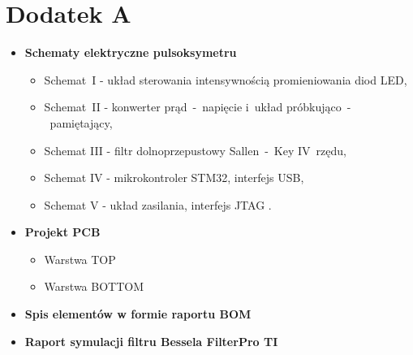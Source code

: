 \renewcommand{\figurename}{Rys.}

\chapter*{Dodatek A}
\label{cha:dodatekA}


\fontsize{14}{15}\selectfont
\begin{itemize}
	\item \textbf{Schematy elektryczne pulsoksymetru}
		\begin{itemize}
			\item Schemat~I  - układ sterowania intensywnością promieniowania diod LED,
			\item Schemat~II - konwerter prąd~-~napięcie i~układ  próbkująco~-~pamiętający,
			\item Schemat III - filtr dolnoprzepustowy Sallen~-~Key IV~rzędu,
			\item Schemat IV - mikrokontroler STM32, interfejs USB,
			\item Schemat V  - układ zasilania, interfejs JTAG .
		\end{itemize}
	\item \textbf{Projekt PCB}
		\begin{itemize}
			\item Warstwa TOP
			\item Warstwa BOTTOM
		\end{itemize}
	\item \textbf{Spis elementów w formie raportu BOM}
	\item \textbf{Raport symulacji filtru Bessela FilterPro TI}
\end{itemize}







